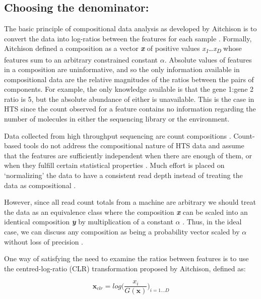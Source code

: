 \documentclass{bmcart}
\begin{document}
\subsection*{Choosing the denominator:}

The basic principle of compositional data analysis as developed by Aitchison is to convert the data into log-ratios between the features for each sample \cite{Aitchison:1986}. Formally, Aitchison defined a composition as a vector \textit{\textbf{x}}  of positive values \textit{x\textsubscript{1}}\ldots\textit{x\textsubscript{D}} whose features  sum to an arbitrary constrained constant $\alpha$. Absolute values of features in a composition are uninformative, and so the only information available in compositional data are the relative magnitudes of the ratios between the pairs of components. For example, the only knowledge available is that the gene 1:gene 2 ratio is 5, but the absolute abundance of either is unavailable. This is the case in HTS since the count observed for a feature contains no information regarding the number of molecules in either the sequencing library or the environment.

Data collected from high throughput sequencing are count compositions \cite{fernandes:2014,gloorAJS:2016}. Count-based tools do not address the compositional nature of HTS data \cite{gloorAJS:2016,fernandes:2014} and assume that the features are sufficiently independent when there are enough of them, or when they fulfill certain statistical properties \cite{Weiss:2016aa}. Much effort is placed on `normalizing' the data to have a consistent read depth instead of treating the data as compositional \cite{Sun:2013aa,McMurdie:2014a}.

However, since all read count totals from a machine are arbitrary we should treat the data as an equivalence class  where the composition \textit{\bf{x}} can be scaled into an identical composition \textit{\textbf{y}} by multiplication of a constant $\alpha$ \cite{barcelo:2001}. Thus, in the ideal case, we can discuss any composition as being a probability vector scaled by $\alpha$ without loss of precision \cite{fernandes:2013}. 

One way of satisfying the need to examine the ratios between features is to use the centred-log-ratio (CLR) transformation proposed by Aitchison, defined as: 

\begin{equation}
\textbf{x}_{clr} = log  \big( \frac{x_i}{G(\textbf{x})}   \big)_{i=1\dots D}
\label{eq:CLR}
\end{equation}
\end{document}
